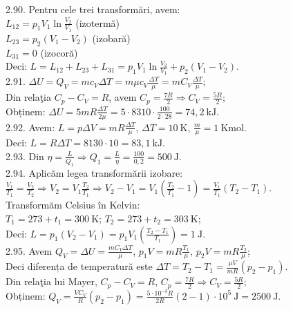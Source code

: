 2.90. Pentru cele trei transformări, avem:\\ $L_{12}=p_{1} V_{1} \ln \frac{V_{2}}{V_{1}}$ \quad (izotermă)\\ $L_{23}=p_{2}\left(V_{1}-V_{2}\right)$ \quad (izobară)\\ $L_{31}=0$ \quad (izocoră)\\ Deci: $L=L_{12}+L_{23}+L_{31}=p_{1} V_{1} \ln \frac{V_{2}}{V_{1}}+p_{2}\left(V_{1}-V_{2}\right)$.\\

2.91. $\Delta U=Q_{V}=m c_{V} \Delta T=m \mu c_{V} \frac{\Delta T}{\mu}=m C_{V} \frac{\Delta T}{\mu}$;\\ Din relaţia $C_{p}-C_{V}=R$, avem $C_{p}=\frac{7 R}{2} \Rightarrow C_{V}=\frac{5 R}{2}$;\\ Obținem: $\Delta U=5 m R \frac{\Delta T}{2 \mu}=5 \cdot 8310 \cdot \frac{100}{2 \cdot 28}=74,2 \mathrm{~kJ}$.\\

2.92. Avem: $L=p \Delta V=m R \frac{\Delta T}{\mu}$, $\Delta T=10 \mathrm{~K}$, $\frac{m}{\mu}=1 \mathrm{~Kmol}$.\\ Deci: $L=R \Delta T=8130 \cdot 10=83,1 \mathrm{~kJ}$.\\

2.93. Din $\eta=\frac{L}{Q_{1}} \Rightarrow Q_{1}=\frac{L}{\eta}=\frac{100}{0,2}=500 \mathrm{~J}$.\\

2.94. Aplicăm legea transformării izobare:\\ $\frac{V_{1}}{T_{1}}=\frac{V_{2}}{T_{2}} \Rightarrow V_{2}=V_{1} \frac{T_{2}}{T_{1}} \Rightarrow V_{2}-V_{1}=V_{1}\left(\frac{T_{2}}{T_{1}}-1\right)=\frac{V_{1}}{T_{1}}\left(T_{2}-T_{1}\right)$.\\ Transformăm Celsius în Kelvin:\\ $T_{1}=273+t_{1}=300 \mathrm{~K}$; \quad $T_{2}=273+t_{2}=303 \mathrm{~K}$;\\ Deci: $L=p_{1}\left(V_{2}-V_{1}\right)=p_{1} V_{1}\left(\frac{T_{2}-T_{1}}{T_{1}}\right)=1 \mathrm{~J}$.\\

2.95. Avem $Q_{V}=\Delta U=\frac{m C_{V} \Delta T}{\mu}$, $p_{1} V=m R \frac{T_{1}}{\mu}$, $p_{2} V=m R \frac{T_{2}}{\mu}$;\\ Deci diferența de temperatură este $\Delta T=T_{2}-T_{1}=\frac{\mu V}{m R}\left(p_{2}-p_{1}\right)$.\\ Din relaţia lui Mayer, $C_{p}-C_{V}=R$, $C_{p}=\frac{7 R}{2} \Rightarrow C_{V}=\frac{5 R}{2}$;\\ Obținem: $Q_{V}=\frac{V C_{V}}{R}\left(p_{2}-p_{1}\right)=\frac{5 \cdot 10^{-3} R}{2 R}(2-1) \cdot 10^{5} \mathrm{~J}=2500 \mathrm{~J}$.\\

